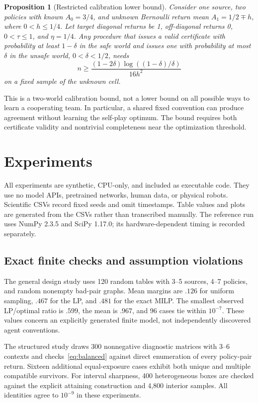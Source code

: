 \documentclass[11pt]{article}
\newtheorem{proposition}[theorem]{Proposition}
\theoremstyle{definition}\newtheorem{definition}[theorem]{Definition}
\newcommand{\1}{\mathbf{1}}
\begin{document}
\begin{proposition}[Restricted calibration lower bound]\label{prop:lower}
Consider one source, two policies with known $A_0=3/4$, and unknown Bernoulli return mean $A_1=1/2\mp h$, where $0<h\leq1/4$. Let target diagonal returns be 1, off-diagonal returns 0, $0<\tau\leq1$, and $\eta=1/4$. Any procedure that issues a valid certificate with probability at least $1-\delta$ in the safe world and issues one with probability at most $\delta$ in the unsafe world, $0<\delta<1/2$, needs
\begin{equation}
 n\geq\frac{(1-2\delta)\log((1-\delta)/\delta)}{16h^2}
\end{equation}
on a fixed sample of the unknown cell.
\end{proposition}
This is a two-world calibration bound, not a lower bound on all possible ways to learn a cooperating team. In particular, a shared fixed convention can produce agreement without learning the self-play optimum. The bound requires both certificate validity and nontrivial completeness near the optimization threshold.

\section{Experiments}
\label{sec:experiments}
All experiments are synthetic, CPU-only, and included as executable code. They use no model APIs, pretrained networks, human data, or physical robots. Scientific CSVs record fixed seeds and omit timestamps. Table values and plots are generated from the CSVs rather than transcribed manually. The reference run uses NumPy 2.3.5 and SciPy 1.17.0; its hardware-dependent timing is recorded separately.

\subsection{Exact finite checks and assumption violations}
The general design study uses 120 random tables with 3--5 sources, 4--7 policies, and random nonempty bad-pair graphs. Mean margins are $.126$ for uniform sampling, $.467$ for the LP, and $.481$ for the exact MILP. The smallest observed LP/optimal ratio is $.599$, the mean is $.967$, and 96 cases tie within $10^{-7}$. These values concern an explicitly generated finite model, not independently discovered agent conventions.

The structured study draws 300 nonnegative diagnostic matrices with 3--6 contexts and checks~\eqref{eq:balanced} against direct enumeration of every policy-pair return. Sixteen additional equal-exposure cases exhibit both unique and multiple compatible survivors. For interval sharpness, 400 heterogeneous boxes are checked against the explicit attaining construction and 4,800 interior samples. All identities agree to $10^{-9}$ in these experiments.
\end{document}

